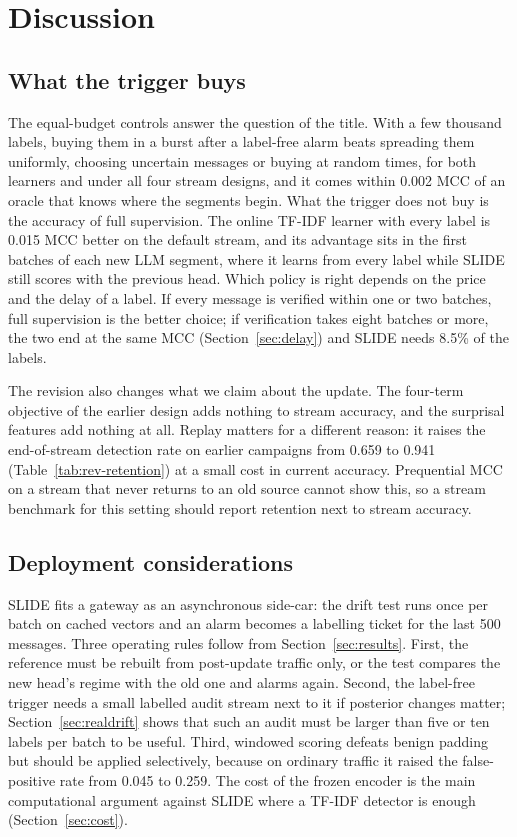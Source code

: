 \section{Discussion}\label{sec:discussion}

\subsection{What the trigger buys}
The equal-budget controls answer the question of the title. With a few thousand labels, buying them in a burst after a label-free alarm beats spreading them uniformly, choosing uncertain messages or buying at random times, for both learners and under all four stream designs, and it comes within 0.002 MCC of an oracle that knows where the segments begin. What the trigger does not buy is the accuracy of full supervision. The online TF-IDF learner with every label is 0.015 MCC better on the default stream, and its advantage sits in the first batches of each new LLM segment, where it learns from every label while SLIDE still scores with the previous head. Which policy is right depends on the price and the delay of a label. If every message is verified within one or two batches, full supervision is the better choice; if verification takes eight batches or more, the two end at the same MCC (Section~\ref{sec:delay}) and SLIDE needs 8.5\% of the labels.

The revision also changes what we claim about the update. The four-term objective of the earlier design adds nothing to stream accuracy, and the surprisal features add nothing at all. Replay matters for a different reason: it raises the end-of-stream detection rate on earlier campaigns from 0.659 to 0.941 (Table~\ref{tab:rev-retention}) at a small cost in current accuracy. Prequential MCC on a stream that never returns to an old source cannot show this, so a stream benchmark for this setting should report retention next to stream accuracy.

\subsection{Deployment considerations}
SLIDE fits a gateway as an asynchronous side-car: the drift test runs once per batch on cached vectors and an alarm becomes a labelling ticket for the last 500 messages. Three operating rules follow from Section~\ref{sec:results}. First, the reference must be rebuilt from post-update traffic only, or the test compares the new head's regime with the old one and alarms again. Second, the label-free trigger needs a small labelled audit stream next to it if posterior changes matter; Section~\ref{sec:realdrift} shows that such an audit must be larger than five or ten labels per batch to be useful. Third, windowed scoring defeats benign padding but should be applied selectively, because on ordinary traffic it raised the false-positive rate from 0.045 to 0.259. The cost of the frozen encoder is the main computational argument against SLIDE where a TF-IDF detector is enough (Section~\ref{sec:cost}).

